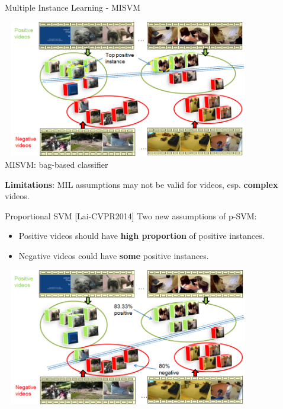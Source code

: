 \documentclass{beamer}
\begin{document}
\begin{frame}{Multiple Instance Learning - MISVM} 	

	\begin{center}
		\includegraphics[width=11cm,height=6cm]{images/part4/MI-SVM.png}
		\\
		\scriptsize{MISVM: bag-based classifier}
	\end{center}
\textbf{Limitations}: MIL assumptions may not be valid for videos, esp. \textbf{complex} videos.
\end{frame}	

\begin{frame}{Proportional SVM [Lai-CVPR2014]} 	
	Two new assumptions of p-SVM:
	\begin{itemize}	
		\item Positive videos should have \textbf{high proportion} of positive instances.
		\item Negative videos could have \textbf{some} positive instances.
	\end{itemize}	
	
	\begin{center}
		\includegraphics[width=11cm,height=6cm]{images/part4/pSVM.png}
	\end{center}
	
\end{frame}	
\end{document}
